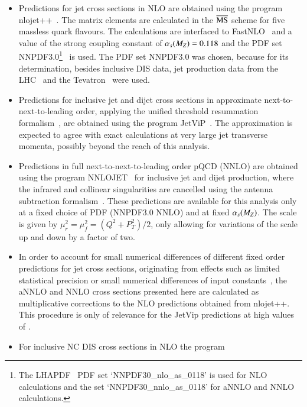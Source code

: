 \documentclass[12pt]{article}
\begin{document}
\begin{itemize}
  \item Predictions for jet cross sections in NLO are obtained using the program nlojet++~\cite{Nagy1,Nagy2,Nagy3}.
    The matrix elements are calculated in the $\overline{\mbox{\rm MS}}$ scheme for
    five massless quark flavours.
    The calculations are interfaced to FastNLO~\cite{fastNLO1,fastNLO2} and a value of the strong coupling constant
    of $\asmz=0.118$ and the PDF set NNPDF3.0\footnote{The LHAPDF~\cite{lhapdf} PDF set `NNPDF30\_nlo\_as\_0118' is used for NLO calculations and the set `NNPDF30\_nnlo\_as\_0118' for aNNLO and NNLO calculations.}~\cite{NNPDF30} is used. 
    The PDF set NNPDF3.0 was chosen, because for its determination, besides inclusive DIS data, jet production data from the LHC~\cite{ATLASjets7,CMSjets7,CMSjets2p76} and the Tevatron~\cite{CDFjetsRunI,CDFjetsRunII,D0jets} were used.
%
  \item  Predictions for inclusive jet and dijet cross sections 
    in approximate next-to-next-to-leading order, applying the unified threshold resummation formalism~\cite{aNNLO},
    are obtained \cite{aNNLOprivate} using the program JetViP~\cite{JetVip1,JetVip2,JetVip3,JetVip4,JetVip5}.
The approximation is expected to agree with exact calculations at very large jet transverse momenta, possibly beyond the reach of this analysis.
  \item  Predictions in full next-to-next-to-leading order pQCD (NNLO) are obtained \cite{NNLOprivate} using the program NNLOJET~\cite{NNLO,NNLO17,NNLOJET}
    for inclusive jet and dijet production, where the infrared and collinear singularities are cancelled using the antenna subtraction formalism~\cite{antenna1,antenna2,antenna3,antenna4}.
    These predictions are available for this analysis only at a fixed
choice of PDF (NNPDF3.0 NNLO) and at fixed $\asmz$. The scale is given
by $\mu_r^2=\mu_f^2=(Q^2+P_T^2)/2$, only allowing for variations of the scale up and down by a factor of two.
    \item In order to account for small numerical differences of different fixed order predictions for jet cross sections, 
      originating from effects such as limited statistical precision
      or small numerical 
      differences of input constants~\cite{IRinsens}, the aNNLO and NNLO cross sections presented here are calculated 
      as multiplicative corrections to the NLO predictions obtained from nlojet++.
This procedure is only of
      relevance for the JetVip predictions at high values of \ptjet.
  \item   For inclusive NC DIS cross sections in NLO the program

\end{itemize}
\end{document}
